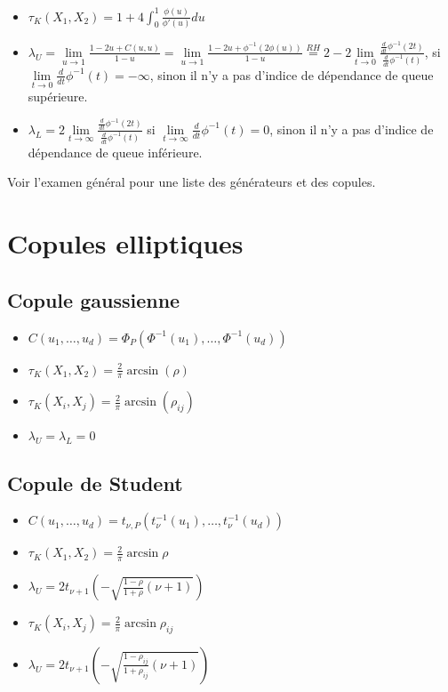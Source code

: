 \begin{itemize}
	\item $\displaystyle \tau_K(X_1, X_2) = 1 + 4\int_{0}^{1}\frac{\phi(u)}{\phi'(u)}du$
	\item $\displaystyle \lambda_U = \lim\limits_{u\to 1} \frac{1 - 2u + C(u, u)}{1-u} = \lim\limits_{u\to 1} \frac{1 - 2u + \phi^{-1}(2\phi(u))}{1-u} \stackrel{RH}{=} 2 - 2\lim\limits_{t \to 0} \frac{\frac{d}{dt}\phi^{-1}(2t)}{\frac{d}{dt}\phi^{-1}(t)}$, si $\displaystyle \lim\limits_{t\to 0}\frac{d}{dt}\phi^{-1}(t) = -\infty$, sinon il n'y a pas d'indice de dépendance de queue supérieure. 
	\item $\displaystyle \lambda_L = 2\lim\limits_{t\to \infty} \frac{\frac{d}{dt}\phi^{-1}(2t)}{\frac{d}{dt}\phi^{-1}(t)}$ si $\displaystyle \lim\limits_{t\to \infty} \frac{d}{dt}\phi^{-1}(t) = 0$, sinon il n'y a pas d'indice de dépendance de queue inférieure.
\end{itemize}

Voir l'examen général pour une liste des générateurs et des copules. 

\section{Copules elliptiques}

\subsection{Copule gaussienne}

\begin{itemize}
	\item $\displaystyle C(u_1, \dots, u_d) = \Phi_P(\Phi^{-1}(u_1), \dots, \Phi^{-1}(u_d))$
	\item $\displaystyle \tau_K(X_1, X_2) = \frac{2}{\pi}\arcsin(\rho)$
	\item $\displaystyle \tau_K(X_i, X_j) = \frac{2}{\pi}\arcsin(\rho_{ij})$
	\item $\lambda_U = \lambda_L = 0$
\end{itemize}

\subsection{Copule de Student}

\begin{itemize}
	\item $\displaystyle C(u_1, \dots, u_d) = t_{\nu, P}\left(t^{-1}_\nu(u_1), \dots, t^{-1}_\nu(u_d)\right)$
	\item $\displaystyle \tau_K(X_1, X_2) = \frac{2}{\pi}\arcsin \rho$
	\item $\displaystyle \lambda_U = 2t_{\nu + 1}\left(-\sqrt{\frac{1-\rho}{1 + \rho}(\nu + 1)}\right)$
	\item $\displaystyle \tau_K(X_i, X_j) = \frac{2}{\pi}\arcsin \rho_{ij}$
	\item $\displaystyle \lambda_U = 2t_{\nu + 1}\left(-\sqrt{\frac{1-\rho_{ij}}{1 + \rho_{ij}}(\nu + 1)}\right)$
\end{itemize}


